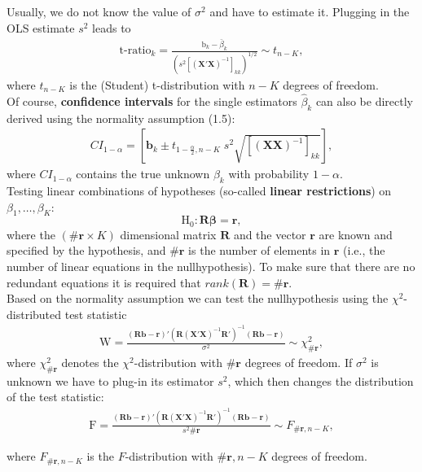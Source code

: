 \documentclass[
]{book}
\begin{document}
Usually, we do not know the value of \(\sigma^2\) and have to estimate it.
Plugging in the OLS estimate \(s^2\) leads to
\begin{align*}
  \text{t-ratio}_k=\frac{\text{b}_k-\bar{\beta}_k}{\left(s^2\left[(\mathbf{X}'\mathbf{X})^{-1}\right]_{kk}\right)^{1/2}}\sim t_{n-K},
\end{align*}
where \(t_{n-K}\) is the (Student) t-distribution with \(n-K\) degrees of
freedom.\\
Of course, \textbf{confidence intervals} for the single estimators
\(\hat\beta_k\) can also be directly derived using the normality assumption (1.5):
\begin{align*}
  CI_{1-\alpha} = \left[\mathbf{b}_k\pm t_{1-\frac{\alpha}{2},n-K}\;s^2\sqrt{\left[(\mathbf{X}\mathbf{X})^{-1}\right]_{kk}}\right],
\end{align*}
where \(CI_{1-\alpha}\) contains the true unknown \(\beta_k\) with
probability \(1-\alpha\).\\
Testing linear combinations of hypotheses (so-called \textbf{linear
restrictions}) on \(\beta_1,\dots,\beta_K\):
\[\text{H}_0: \mathbf{R}\boldsymbol{\beta}=\mathbf{r},\] where the
\((\#\mathbf{r}\times K)\) dimensional matrix \(\mathbf{R}\) and the vector
\(\mathbf{r}\) are known and specified by the hypothesis, and
\(\#\mathbf{r}\) is the number of elements in \(\mathbf{r}\) (i.e., the
number of linear equations in the nullhypothesis). To make sure that
there are no redundant equations it is required that
\(rank(\mathbf{R})=\#\mathbf{r}\).\\
Based on the normality assumption we can test the nullhypothesis using
the \(\chi^2\)-distributed test statistic
\begin{align*}
  \text{W}=\frac{(\mathbf{R}\mathbf{b}-\mathbf{r})'(\mathbf{R}(\mathbf{X}'\mathbf{X})^{-1}\mathbf{R}')^{-1}(\mathbf{R}\mathbf{b}-\mathbf{r})}{\sigma^2}\sim \chi^2_{\#\mathbf{r}},
\end{align*}
where \(\chi^2_{\#\mathbf{r}}\) denotes the \(\chi^2\)-distribution with
\(\#\mathbf{r}\) degrees of freedom. If \(\sigma^2\) is unknown we have to
plug-in its estimator \(s^2\), which then changes the distribution of the
test statistic:
\begin{align*}
  \text{F}=\frac{(\mathbf{R}\mathbf{b}-\mathbf{r})'(\mathbf{R}(\mathbf{X}'\mathbf{X})^{-1}\mathbf{R}')^{-1}(\mathbf{R}\mathbf{b}-\mathbf{r})}{s^2 \#\mathbf{r}}\sim F_{\#\mathbf{r},n-K},
\end{align*}

where \(F_{\#\mathbf{r},n-K}\) is the \(F\)-distribution with
\(\#\mathbf{r},n-K\) degrees of freedom.
\end{document}
